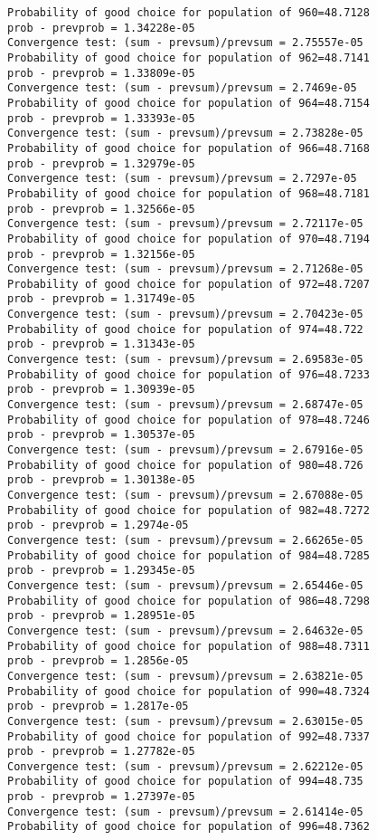 \documentclass[11pt,onecolumn]{article}
\begin{document}
\begin{verbatim}
Probability of good choice for population of 960=48.7128
prob - prevprob = 1.34228e-05
Convergence test: (sum - prevsum)/prevsum = 2.75557e-05
Probability of good choice for population of 962=48.7141
prob - prevprob = 1.33809e-05
Convergence test: (sum - prevsum)/prevsum = 2.7469e-05
Probability of good choice for population of 964=48.7154
prob - prevprob = 1.33393e-05
Convergence test: (sum - prevsum)/prevsum = 2.73828e-05
Probability of good choice for population of 966=48.7168
prob - prevprob = 1.32979e-05
Convergence test: (sum - prevsum)/prevsum = 2.7297e-05
Probability of good choice for population of 968=48.7181
prob - prevprob = 1.32566e-05
Convergence test: (sum - prevsum)/prevsum = 2.72117e-05
Probability of good choice for population of 970=48.7194
prob - prevprob = 1.32156e-05
Convergence test: (sum - prevsum)/prevsum = 2.71268e-05
Probability of good choice for population of 972=48.7207
prob - prevprob = 1.31749e-05
Convergence test: (sum - prevsum)/prevsum = 2.70423e-05
Probability of good choice for population of 974=48.722
prob - prevprob = 1.31343e-05
Convergence test: (sum - prevsum)/prevsum = 2.69583e-05
Probability of good choice for population of 976=48.7233
prob - prevprob = 1.30939e-05
Convergence test: (sum - prevsum)/prevsum = 2.68747e-05
Probability of good choice for population of 978=48.7246
prob - prevprob = 1.30537e-05
Convergence test: (sum - prevsum)/prevsum = 2.67916e-05
Probability of good choice for population of 980=48.726
prob - prevprob = 1.30138e-05
Convergence test: (sum - prevsum)/prevsum = 2.67088e-05
Probability of good choice for population of 982=48.7272
prob - prevprob = 1.2974e-05
Convergence test: (sum - prevsum)/prevsum = 2.66265e-05
Probability of good choice for population of 984=48.7285
prob - prevprob = 1.29345e-05
Convergence test: (sum - prevsum)/prevsum = 2.65446e-05
Probability of good choice for population of 986=48.7298
prob - prevprob = 1.28951e-05
Convergence test: (sum - prevsum)/prevsum = 2.64632e-05
Probability of good choice for population of 988=48.7311
prob - prevprob = 1.2856e-05
Convergence test: (sum - prevsum)/prevsum = 2.63821e-05
Probability of good choice for population of 990=48.7324
prob - prevprob = 1.2817e-05
Convergence test: (sum - prevsum)/prevsum = 2.63015e-05
Probability of good choice for population of 992=48.7337
prob - prevprob = 1.27782e-05
Convergence test: (sum - prevsum)/prevsum = 2.62212e-05
Probability of good choice for population of 994=48.735
prob - prevprob = 1.27397e-05
Convergence test: (sum - prevsum)/prevsum = 2.61414e-05
Probability of good choice for population of 996=48.7362

\end{verbatim}
\end{document}

